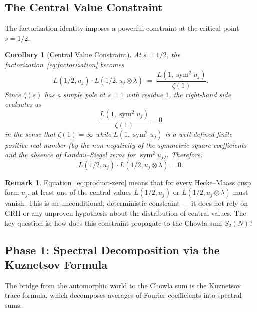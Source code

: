 \documentclass[11pt,a4paper]{article}
\theoremstyle{plain}
\newtheorem{corollary}[theorem]{Corollary}
\theoremstyle{definition}
\newtheorem{remark}[theorem]{Remark}
\newcommand{\sym}{\operatorname{sym}}
\begin{document}
\subsection{The Central Value Constraint}

The factorization identity imposes a powerful constraint at the critical point $s = 1/2$.

\begin{corollary}[Central Value Constraint]\label{cor:central-value}
At $s = 1/2$, the factorization~\eqref{eq:factorization} becomes
\begin{equation}\label{eq:central}
L(1/2, u_j) \cdot L(1/2, u_j \otimes \lambda) \;=\; \frac{L(1, \sym^2 u_j)}{\zeta(1)}.
\end{equation}
Since $\zeta(s)$ has a simple pole at $s = 1$ with residue $1$, the right-hand side evaluates as
\[
\frac{L(1, \sym^2 u_j)}{\zeta(1)} = 0
\]
in the sense that $\zeta(1) = \infty$ while $L(1, \sym^2 u_j)$ is a well-defined finite positive real number (by the non-negativity of the symmetric square coefficients and the absence of Landau--Siegel zeros for $\sym^2 u_j$). Therefore:
\begin{equation}\label{eq:product-zero}
L(1/2, u_j) \cdot L(1/2, u_j \otimes \lambda) = 0.
\end{equation}
\end{corollary}

\begin{remark}
Equation~\eqref{eq:product-zero} means that for every Hecke--Maass cusp form $u_j$, at least one of the central values $L(1/2, u_j)$ or $L(1/2, u_j \otimes \lambda)$ must vanish. This is an unconditional, deterministic constraint --- it does not rely on GRH or any unproven hypothesis about the distribution of central values. The key question is: how does this constraint propagate to the Chowla sum $S_2(N)$?
\end{remark}

\subsection{Phase 1: Spectral Decomposition via the Kuznetsov Formula}

The bridge from the automorphic world to the Chowla sum is the Kuznetsov trace formula, which decomposes averages of Fourier coefficients into spectral sums.
\end{document}
